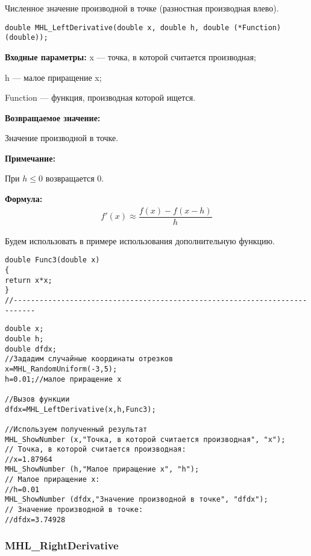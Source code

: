 \documentclass[a4paper,12pt]{article}
\begin{document}
Численное значение производной в точке (разностная производная влево).


\begin{lstlisting}[label=code_syntax_MHL_LeftDerivative,caption=Синтаксис]
double MHL_LeftDerivative(double x, double h, double (*Function)(double));
\end{lstlisting}

\textbf{Входные параметры:}
 x --- точка, в которой считается производная;
 
 h --- малое приращение x;
 
 Function --- функция, производная которой ищется.

\textbf{Возвращаемое значение:}
 
 Значение производной в точке.
 
 \textbf{Примечание:}
 
 При $h\leq0$ возвращается $0$.

\textbf{Формула:}
\begin{eqnarray*}
f'\left( x\right) \approx \dfrac{f\left( x\right)-f\left( x-h\right) }{h}
\end{eqnarray*}

Будем использовать в примере использования дополнительную функцию.

\begin{lstlisting}[caption=Дополнительная функция]
double Func3(double x)
{
return x*x;
}
//---------------------------------------------------------------------------
\end{lstlisting}


\begin{lstlisting}[label=code_use_MHL_LeftDerivative,caption=Пример использования]
double x;
double h;
double dfdx;
//Зададим случайные координаты отрезков
x=MHL_RandomUniform(-3,5);
h=0.01;//малое приращение x

//Вызов функции
dfdx=MHL_LeftDerivative(x,h,Func3);

//Используем полученный результат
MHL_ShowNumber (x,"Точка, в которой считается производная", "x");
// Точка, в которой считается производная:
//x=1.87964
MHL_ShowNumber (h,"Малое приращение x", "h");
// Малое приращение x:
//h=0.01
MHL_ShowNumber (dfdx,"Значение производной в точке", "dfdx");
// Значение производной в точке:
//dfdx=3.74928
\end{lstlisting}

\subsubsection{MHL\_RightDerivative}\label{MHL_RightDerivative}
\end{document}
